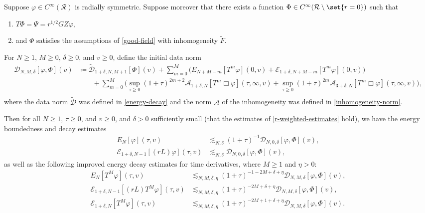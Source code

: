 \documentclass[10pt, reqno]{amsart}
\begin{document}
\begin{proposition}
Suppose \(\varphi{}\in C^\infty(\mathcal{R})\) is radially symmetric. Suppose moreover that there
exists a function \(\Phi{}\in C^\infty(\mathcal{R}\setminus \set{r=0})\) such that
\begin{enumerate}
\item \label{time-inversion-assumption} \(T\Phi{} = \Psi{} = r^{1/2}GZ\varphi{}\),
\item \label{u-rp-assumption} and \(\Phi{}\) satisfies the assumptions of \cref{good-field}
with inhomogeneity \(\tilde{F}\).
\end{enumerate}
For \(N\ge 1\), \(M\ge 0\), \(\delta{}\ge 0\), and \(v\ge 0\), define the initial data norm
\begin{equation}
\begin{split}
\mathcal{D}_{N,M,\delta{}}[\varphi{},\Phi{}](v)&\coloneqq{}\tilde{\mathcal{D}}_{1+\delta{},N,M+1}[\Phi{}](v) +  \sum_{m=0}^M \bigl(E_{N+M-m}[T^m\varphi{}](0,v) + \mathcal{E}_{1+\delta{},N+M-m}[T^m\varphi{}](0,v)\bigr) \\
&\qquad + \sum_{m=0}^M\bigl(\sup_{\tau{}\ge 0}(1+\tau{})^{2m+2}\mathcal{A}_{1+\delta{},N}[T^m\Box{}\varphi{}](\tau{},\infty,v) +\sup_{\tau{}\ge 0}(1+\tau{})^{2m}\mathcal{A}_{3+\delta{},N}[T^m\Box{}\varphi{}](\tau{},\infty,v)\bigr), \\
\end{split}
\end{equation}
where the data norm \(\tilde{\mathcal{D}}\) was defined in \cref{energy-decay} and
the norm \(\mathcal{A}\) of the inhomogeneity was defined in \cref{inhomogeneity-norm}.

Then for all \(N\ge 1\), \(\tau{}\ge 0\), and \(v\ge 0\), and \(\delta{} > 0\) sufficiently small
(that the estimates of \cref{r-weighted-estimates} hold),
we have the energy boundedness and decay estimates
\begin{align}
E_N[\varphi{}](\tau{},v)&\lesssim_{N,\delta{}} (1 + \tau{})^{-1}\mathcal{D}_{N,0,\delta{}}[\varphi{},\Phi{}](v), \\
\mathcal{E}_{1+\delta{},N-1}[(rL)\varphi{}](\tau{},v)&\lesssim_{N,\delta{}} \mathcal{D}_{N,0,\delta{}}[\varphi{},\Phi{}](v),
\end{align}
as well as the following improved energy decay estimates for time derivatives,
where \(M\ge 1\) and \(\eta{} > 0\):
\begin{align}
E_N[T^M\varphi{}](\tau{},v)&\lesssim_{N,M,\delta{},\eta{}} (1+\tau{})^{-1-2M+\delta{}+\eta{}}\mathcal{D}_{N,M,\delta{}}[\varphi{},\Phi{}](v), \label{eda-T} \\
\mathcal{E}_{1+\delta,N-1}[(rL)T^M\varphi{}](\tau{},v)&\lesssim_{N,M,\delta{},\eta{}}  (1+\tau{})^{-2M+\delta{}+\eta{}}\mathcal{D}_{N,M,\delta{}}[\varphi{},\Phi{}](v), \label{eda-weighted-rL} \\
\mathcal{E}_{1+\delta,N}[T^M\varphi{}](\tau{},v)&\lesssim_{N,M,\delta{},\eta{}}  (1+\tau{})^{-2M+ 1 + \delta{}+\eta{}}\mathcal{D}_{N,M,\delta{}}[\varphi{},\Phi{}](v). \label{eda-weighted}
\end{align}
\label{energy-decay-radially-symmetric}
\end{proposition}
\end{document}
